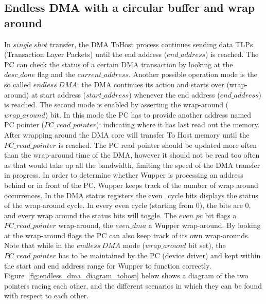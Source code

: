 \newpage
\subsection{Endless DMA with a circular buffer and wrap around}
\label{sec:endless_dma}
In $single\ shot$ transfer, the DMA ToHost process continues sending data TLPs (Transaction Layer Packets) until the end address ($end\_address$) is reached.
The PC can check the status of a certain DMA transaction by looking at the $desc\_done$ flag and the $current\_address$. Another possible operation mode is the so called $endless\ DMA$: the DMA continues its action and starts over (wrap-around) at start address ($start\_address$) whenever the end address ($end\_address$) is reached. The second mode is enabled by asserting the wrap-around ($wrap\_around$) bit. In this mode the PC has to provide another address named PC pointer ($PC\_read\_pointer$): indicating where it has last read out the memory. After wrapping around the DMA core will transfer To Host memory until the $PC\_read\_pointer$ is reached. The PC read pointer should be updated more often than the wrap-around time of the DMA, however it should not be read too often as that would take up all the bandwidth, limiting the speed of the DMA transfer in progress. In order to determine whether Wupper is processing an address behind or in front of the PC, Wupper keeps track of the number of wrap around occurrences. In the DMA status registers the even\_cycle bits displays the status of the wrap-around cycle. In every even cycle (starting from 0), the bits are 0, and every wrap around the status bits will toggle. The $even\_pc$ bit flags a $PC\_read\_pointer$ wrap-around, the $even\_dma$ a Wupper wrap-around. By looking at the wrap-around flags the PC can also keep track of its own wrap-arounds. Note that while in the $endless\ DMA$ mode ($wrap\_around$ bit set), the $PC\_read\_pointer$ has to be maintained by the PC (device driver) and kept within the start and end address range for Wupper to function correctly. Figure~\ref{fig:endless_dma_diagram_tohost} below shows a diagram of the two pointers racing each other, and the different scenarios in which they can be found with respect to each other. 
\newpage
